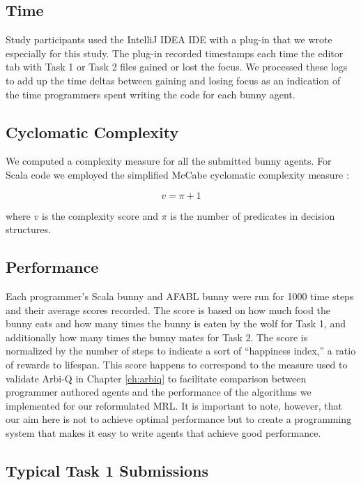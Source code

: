 \subsection{Time}

Study participants used the IntelliJ IDEA IDE with a plug-in that we wrote especially for this study. The plug-in recorded timestamps each time the editor tab with Task 1 or Task 2 files gained or lost the focus. We processed these logs to add up the time deltas between gaining and losing focus as an indication of the time programmers spent writing the code for each bunny agent.

\subsection{Cyclomatic Complexity}

We computed a complexity measure for all the submitted bunny agents. For Scala code we employed the simplified McCabe cyclomatic complexity measure \cite{mccabe1976complexity}:

\begin{equation}
v = \pi + 1
\end{equation}

where $v$ is the complexity score and $\pi$ is the number of predicates in decision structures.

\subsection{Performance}

Each programmer's Scala bunny and AFABL bunny were run for 1000 time steps and their average scores recorded. The score is based on how much food the bunny eats and how many times the bunny is eaten by the wolf for Task 1, and additionally how many times the bunny mates for Task 2. The score is normalized by the number of steps to indicate a sort of ``happiness index,'' a ratio of rewards to lifespan. This score happens to correspond to the measure used to validate Arbi-Q in Chapter \ref{ch:arbiq} to facilitate comparison between programmer authored agents and the performance of the algorithms we implemented for our reformulated MRL. It is important to note, however, that our aim here is not to achieve optimal performance but to create a programming system that makes it easy to write agents that achieve good performance.

\subsection{Typical Task 1 Submissions}


